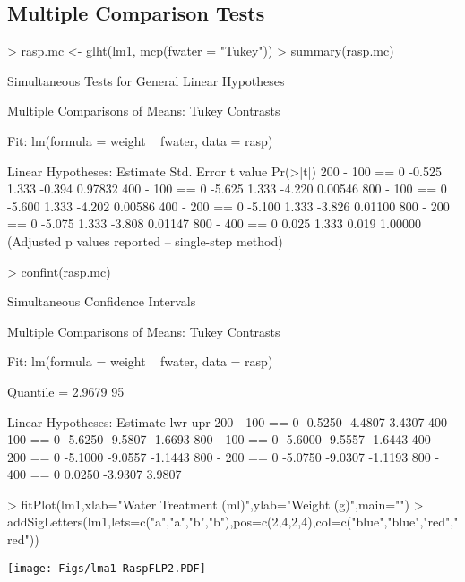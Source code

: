 \documentclass[a4paper]{article}
\begin{document}
\subsection{Multiple Comparison Tests}
\begin{Schunk}
\begin{Sinput}
> rasp.mc <- glht(lm1, mcp(fwater = "Tukey"))
> summary(rasp.mc)
\end{Sinput}
\begin{Soutput}
	 Simultaneous Tests for General Linear Hypotheses

Multiple Comparisons of Means: Tukey Contrasts


Fit: lm(formula = weight ~ fwater, data = rasp)

Linear Hypotheses:
               Estimate Std. Error t value Pr(>|t|)
200 - 100 == 0   -0.525      1.333  -0.394  0.97832
400 - 100 == 0   -5.625      1.333  -4.220  0.00546
800 - 100 == 0   -5.600      1.333  -4.202  0.00586
400 - 200 == 0   -5.100      1.333  -3.826  0.01100
800 - 200 == 0   -5.075      1.333  -3.808  0.01147
800 - 400 == 0    0.025      1.333   0.019  1.00000
(Adjusted p values reported -- single-step method)
\end{Soutput}
\begin{Sinput}
> confint(rasp.mc)
\end{Sinput}
\begin{Soutput}
	 Simultaneous Confidence Intervals

Multiple Comparisons of Means: Tukey Contrasts


Fit: lm(formula = weight ~ fwater, data = rasp)

Quantile = 2.9679
95% family-wise confidence level
 

Linear Hypotheses:
               Estimate lwr     upr    
200 - 100 == 0 -0.5250  -4.4807  3.4307
400 - 100 == 0 -5.6250  -9.5807 -1.6693
800 - 100 == 0 -5.6000  -9.5557 -1.6443
400 - 200 == 0 -5.1000  -9.0557 -1.1443
800 - 200 == 0 -5.0750  -9.0307 -1.1193
800 - 400 == 0  0.0250  -3.9307  3.9807
\end{Soutput}
\begin{Sinput}
> fitPlot(lm1,xlab="Water Treatment (ml)",ylab="Weight (g)",main="")
> addSigLetters(lm1,lets=c("a","a","b","b"),pos=c(2,4,2,4),col=c("blue","blue","red","red"))
\end{Sinput}
\end{Schunk}
\texttt{[image: Figs/lma1-RaspFLP2.PDF]}
\end{document}
